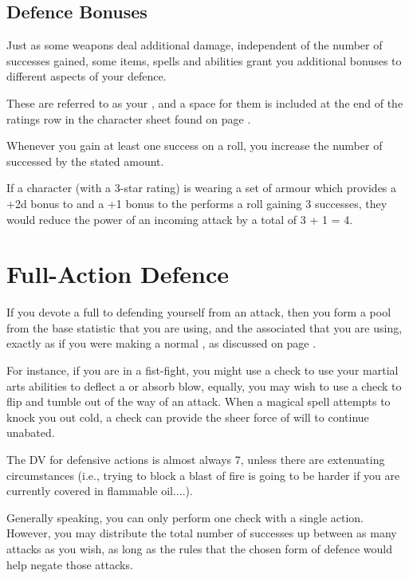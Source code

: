 \subsection{Defence Bonuses}

Just as some weapons deal additional damage, independent of the number of successes gained, some items, spells and abilities grant you additional bonuses to different aspects of your defence.

These are referred to as your , and a space for them is included at the end of the ratings row in the character sheet found on page \pageref{S:CharacterSheet}.

Whenever you gain at least one success on a  roll, you increase the number of successed by the stated amount. 

If a character (with a 3-star  rating) is wearing a set of armour which provides a +2d bonus to  and a +1 bonus to the  performs a  roll gaining 3 successes, they would reduce the power of an incoming attack by a total of 3 + 1 = 4.  

\section{Full-Action Defence}

If you devote a full  to defending yourself from an attack, then you form a pool from the base  statistic that you are using, and the associated  that you are using, exactly as if you were making a normal , as discussed on page \pageref{C:Checks}. 

For instance, if you are in a fist-fight, you might use a  check to use your martial arts abilities to deflect a or absorb blow, equally, you may wish to use a  check to flip and tumble out of the way of an attack. When a magical spell attempts to knock you out cold, a  check can provide the sheer force of will to continue unabated. 

The DV for defensive actions is almost always 7, unless there are extenuating circumstances (i.e., trying to block a blast of fire is going to be harder if you are currently covered in flammable oil....).

Generally speaking, you can only perform one  check with a single action. However, you may distribute the total number of successes up between as many attacks as you wish, as long as the  rules that the chosen form of defence would help negate those attacks. 

